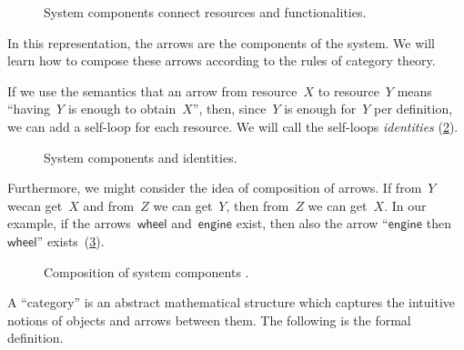 \begin{figure}[h!]
    \centering
    \caption{System components connect resources and functionalities. \label{fig:e2}}
\end{figure}

In this representation, the arrows are the components of the system.
We will learn how to compose these arrows according to the rules of category theory.

If we use the semantics that an arrow from resource~$X$ to resource~$Y$ means ``having~$Y$ is
enough to obtain~$X$'', then, since~$Y$ is enough for~$Y$ per definition, we can add a self-loop for each
resource. We will call the self-loops \emph{identities} (\cref{fig:e3}).

\begin{figure}[h!]
    \centering
    \caption{System components and identities. \label{fig:e3}}
\end{figure}

Furthermore, we might consider the idea of composition of arrows. If from~$Y$ wecan get~$X$ and from~$Z$ we can get~$Y$, then from~$Z$ we can get~$X$. In our example, if the arrows~$\mathsf{wheel}$ and~$\mathsf{engine}$ exist, then also the arrow ``$\mathsf{engine}$ then $\mathsf{wheel}$'' exists~(\cref{fig:e4}).

\begin{figure}[h!]
    \centering
    
    \caption{Composition of system components \label{fig:e4}.}
\end{figure}


A ``category'' is an abstract mathematical
structure which captures the intuitive notions of objects and arrows between them.
The following is the formal definition.

